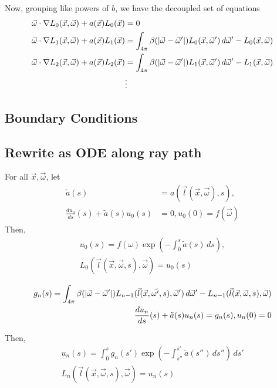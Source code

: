 Now, grouping like powers of $b$, we have the decoupled set of equations
\begin{align}
  \vec{\omega} \cdot \nabla L_0(\vec{x}, \vec{\omega}) + a(\vec{x})L_0(\vec{x}) &= 0 \\
  \vec{\omega} \cdot \nabla L_1(\vec{x}, \vec{\omega}) + a(\vec{x})L_1(\vec{x})
  &= \int_{4\pi} \beta(\left| \vec{\omega} - \vec{\omega}' \right|) L_0(\vec{x}, \vec{\omega}')\,d\vec{\omega}' - L_0(\vec{x}, \vec{\omega}) \\ 
  \vec{\omega} \cdot \nabla L_2(\vec{x}, \vec{\omega}) + a(\vec{x})L_2(\vec{x})
  &= \int_{4\pi} \beta(\left| \vec{\omega} - \vec{\omega}' \right|) L_1(\vec{x}, \vec{\omega}')\,d\vec{\omega}' - L_1(\vec{x}, \vec{\omega}) \\ 
  &\vdots \nonumber
\end{align}

\subsection{Boundary Conditions}

 
\subsection{Rewrite as ODE along ray path}
For all $\vec{x}, \vec{\omega}$, let
\begin{align}
  \tilde{a}(s) &= a(\vec{l}(\vec{x}, \vec{\omega}), s), \\ 
  \frac{du_0}{ds}(s) + \tilde{a}(s) u_0(s) &= 0, u_0(0) = f(\vec{\omega})
\end{align}
Then,
\begin{align}
  u_0(s) = f(\omega) \exp\left(-\int_0^s \tilde{a}(s)\, ds\right), \\
  L_0(\vec{l}(\vec{x}, \vec{\omega},s), \vec{\omega}) = u_0(s)
\end{align}

\begin{align}
  g_n(s) = \int_{4\pi} \beta(\left| \vec{\omega} - \vec{\omega}' \right|)
  L_{n-1}(\vec{l}(\vec{x}, \vec{\omega'}, s), \vec{\omega}')\,d\vec{\omega}' - L_{n-1}(\vec{l}(\vec{x}, \vec{\omega}, s), \vec{\omega}) \\ 
  \frac{du_n}{ds}(s) + \tilde{a}(s)u_n(s) = g_n(s), u_n(0) = 0
\end{align}

Then,
\begin{align}
  u_n(s) = \int_0^sg_n(s')\exp\left( -\int_{s''}^{s'}\tilde{a}(s'')\,ds'' \right)\, ds' \\
  L_n(\vec{l}(\vec{x}, \vec{\omega}, s), \vec{\omega}) = u_n(s)
\end{align}
